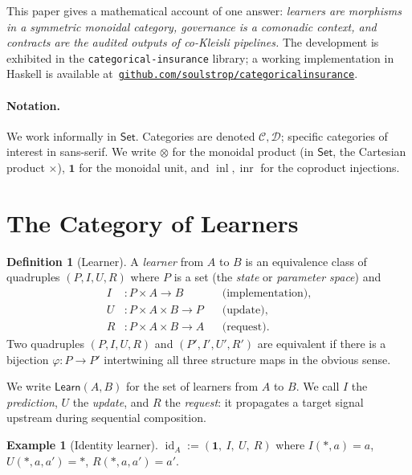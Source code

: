 \documentclass[journal,10pt]{IEEEtran}
\theoremstyle{plain}
\theoremstyle{definition}
\newtheorem{definition}[theorem]{Definition}
\newtheorem{example}[theorem]{Example}
\theoremstyle{remark}
\newcommand{\Set}{\mathsf{Set}}
\newcommand{\Learn}{\mathsf{Learn}}
\DeclareMathOperator{\id}{id}
\DeclareMathOperator{\inl}{inl}
\DeclareMathOperator{\inr}{inr}
\begin{document}
This paper gives a mathematical account of one answer: \emph{learners
are morphisms in a symmetric monoidal category, governance is a
comonadic context, and contracts are the audited outputs of co-Kleisli
pipelines.} The development is exhibited in the
\texttt{categorical-insurance} library; a working implementation in
Haskell is available
at~\href{https://github.com/soulstrop/categorical-insurance}%
{\texttt{github.com/soulstrop/categorical\-insurance}}.

\paragraph*{Notation.}
We work informally in $\Set$. Categories are denoted $\mathcal{C},
\mathcal{D}$; specific categories of interest in
\textsf{sans-serif}. We write $\otimes$ for the monoidal product (in
$\Set$, the Cartesian product $\times$), $\mathbf{1}$ for the
monoidal unit, and $\inl, \inr$ for the coproduct injections.

\section{The Category of Learners}
\label{sec:learners}

\begin{definition}[Learner]\label{def:learner}
A \emph{learner} from $A$ to $B$ is an equivalence class of
quadruples $(P, I, U, R)$ where $P$ is a set (the \emph{state} or
\emph{parameter space}) and
\begin{align*}
I &\colon P \times A \longrightarrow B
   && \text{(implementation),}\\
U &\colon P \times A \times B \longrightarrow P
   && \text{(update),}\\
R &\colon P \times A \times B \longrightarrow A
   && \text{(request).}
\end{align*}
Two quadruples $(P, I, U, R)$ and $(P', I', U', R')$ are equivalent
if there is a bijection $\varphi \colon P \to P'$ intertwining all
three structure maps in the obvious sense.
\end{definition}

We write $\Learn(A, B)$ for the set of learners from $A$ to $B$. We
call $I$ the \emph{prediction}, $U$ the \emph{update}, and $R$ the
\emph{request}: it propagates a target signal upstream during
sequential composition.

\begin{example}[Identity learner]\label{ex:identity}
$\id_A := (\mathbf{1},\ I,\ U,\ R)$ where
$I(*, a) = a$, $U(*, a, a') = *$, $R(*, a, a') = a'$.
\end{example}
\end{document}
